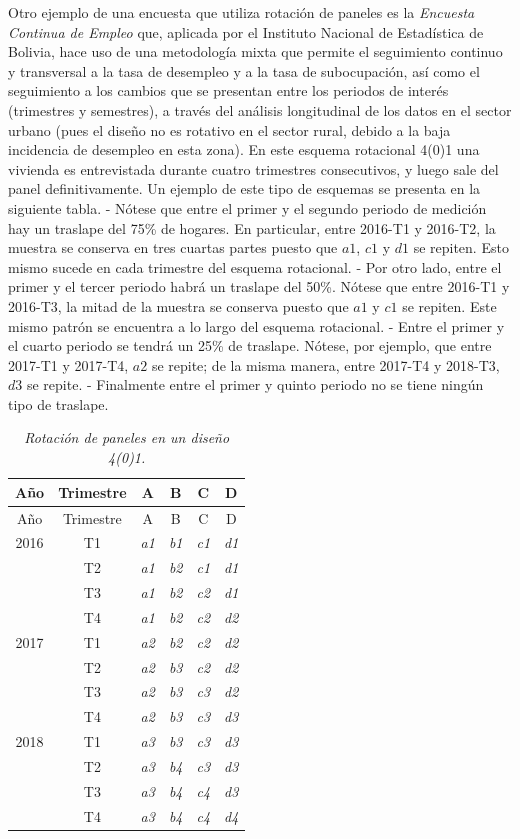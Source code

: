 \documentclass[
  10pt,
  spanish,
]{book}
\begin{document}
Otro ejemplo de una encuesta que utiliza rotación de paneles es la \emph{Encuesta Continua de Empleo} que, aplicada por el Instituto Nacional de Estadística de Bolivia, hace uso de una metodología mixta que permite el seguimiento continuo y transversal a la tasa de desempleo y a la tasa de subocupación, así como el seguimiento a los cambios que se presentan entre los periodos de interés (trimestres y semestres), a través del análisis longitudinal de los datos en el sector urbano (pues el diseño no es rotativo en el sector rural, debido a la baja incidencia de desempleo en esta zona). En este esquema rotacional 4(0)1 una vivienda es entrevistada durante cuatro trimestres consecutivos, y luego sale del panel definitivamente. Un ejemplo de este tipo de esquemas se presenta en la siguiente tabla.
- Nótese que entre el primer y el segundo periodo de medición hay un traslape del 75\% de hogares. En particular, entre 2016-T1 y 2016-T2, la muestra se conserva en tres cuartas partes puesto que \(a1\), \(c1\) y \(d1\) se repiten. Esto mismo sucede en cada trimestre del esquema rotacional.
- Por otro lado, entre el primer y el tercer periodo habrá un traslape del 50\%. Nótese que entre 2016-T1 y 2016-T3, la mitad de la muestra se conserva puesto que \(a1\) y \(c1\) se repiten. Este mismo patrón se encuentra a lo largo del esquema rotacional.
- Entre el primer y el cuarto periodo se tendrá un 25\% de traslape. Nótese, por ejemplo, que entre 2017-T1 y 2017-T4, \(a2\) se repite; de la misma manera, entre 2017-T4 y 2018-T3, \(d3\) se repite.
- Finalmente entre el primer y quinto periodo no se tiene ningún tipo de traslape.

\begin{longtable}[]{@{}cccccc@{}}
\caption{\emph{Rotación de paneles en un diseño 4(0)1.}}\tabularnewline
\toprule
Año & Trimestre & A & B & C & D \\
\midrule
\endfirsthead
\toprule
Año & Trimestre & A & B & C & D \\
\midrule
\endhead
2016 & T1 & \emph{a1} & \emph{b1} & \emph{c1} & \emph{d1} \\
& T2 & \emph{a1} & \emph{b2} & \emph{c1} & \emph{d1} \\
& T3 & \emph{a1} & \emph{b2} & \emph{c2} & \emph{d1} \\
& T4 & \emph{a1} & \emph{b2} & \emph{c2} & \emph{d2} \\
2017 & T1 & \emph{a2} & \emph{b2} & \emph{c2} & \emph{d2} \\
& T2 & \emph{a2} & \emph{b3} & \emph{c2} & \emph{d2} \\
& T3 & \emph{a2} & \emph{b3} & \emph{c3} & \emph{d2} \\
& T4 & \emph{a2} & \emph{b3} & \emph{c3} & \emph{d3} \\
2018 & T1 & \emph{a3} & \emph{b3} & \emph{c3} & \emph{d3} \\
& T2 & \emph{a3} & \emph{b4} & \emph{c3} & \emph{d3} \\
& T3 & \emph{a3} & \emph{b4} & \emph{c4} & \emph{d3} \\
& T4 & \emph{a3} & \emph{b4} & \emph{c4} & \emph{d4} \\
\bottomrule
\end{longtable}
\end{document}
